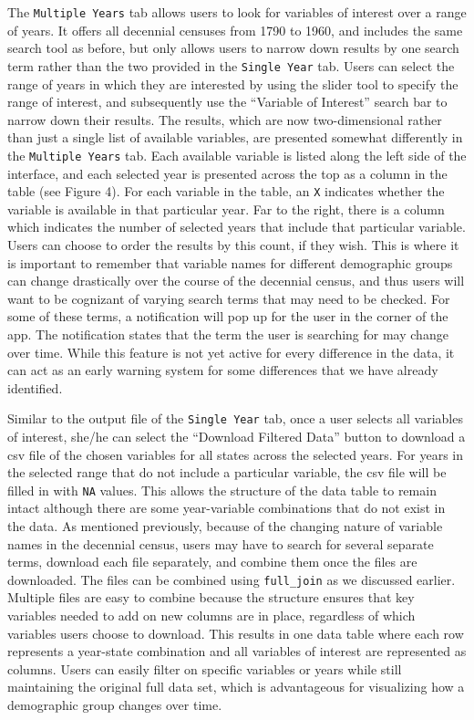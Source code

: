 \documentclass[11pt,]{article}
\begin{document}
The \texttt{Multiple\ Years} tab allows users to look for variables of
interest over a range of years. It offers all decennial censuses from
1790 to 1960, and includes the same search tool as before, but only
allows users to narrow down results by one search term rather than the
two provided in the \texttt{Single\ Year} tab. Users can select the
range of years in which they are interested by using the slider tool to
specify the range of interest, and subsequently use the ``Variable of
Interest'' search bar to narrow down their results. The results, which
are now two-dimensional rather than just a single list of available
variables, are presented somewhat differently in the
\texttt{Multiple\ Years} tab. Each available variable is listed along
the left side of the interface, and each selected year is presented
across the top as a column in the table (see Figure 4). For each
variable in the table, an \texttt{X} indicates whether the variable is
available in that particular year. Far to the right, there is a column
which indicates the number of selected years that include that
particular variable. Users can choose to order the results by this
count, if they wish. This is where it is important to remember that
variable names for different demographic groups can change drastically
over the course of the decennial census, and thus users will want to be
cognizant of varying search terms that may need to be checked. For some
of these terms, a notification will pop up for the user in the corner of
the app. The notification states that the term the user is searching for
may change over time. While this feature is not yet active for every
difference in the data, it can act as an early warning system for some
differences that we have already identified.

Similar to the output file of the \texttt{Single\ Year} tab, once a user
selects all variables of interest, she/he can select the ``Download
Filtered Data'' button to download a csv file of the chosen variables
for all states across the selected years. For years in the selected
range that do not include a particular variable, the csv file will be
filled in with \texttt{NA} values. This allows the structure of the data
table to remain intact although there are some year-variable
combinations that do not exist in the data. As mentioned previously,
because of the changing nature of variable names in the decennial
census, users may have to search for several separate terms, download
each file separately, and combine them once the files are downloaded.
The files can be combined using \texttt{full\_join} as we discussed
earlier. Multiple files are easy to combine because the structure
ensures that key variables needed to add on new columns are in place,
regardless of which variables users choose to download. This results in
one data table where each row represents a year-state combination and
all variables of interest are represented as columns. Users can easily
filter on specific variables or years while still maintaining the
original full data set, which is advantageous for visualizing how a
demographic group changes over time.
\end{document}
